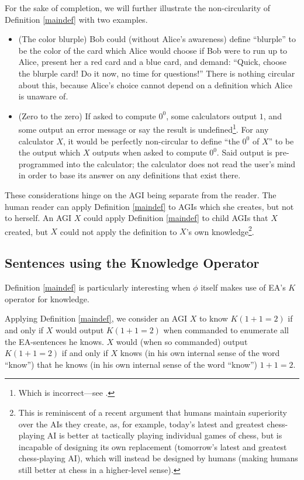 \documentclass[runningheads]{llncs}
\begin{document}
For the sake of completion, we will further illustrate the non-circularity of
Definition \ref{maindef} with two examples.
\begin{itemize}
  \item
  (The color blurple) Bob could (without Alice's awareness) define ``blurple'' to be the
  color of the card
  which Alice would choose if Bob were to run up to Alice, present her a red card
  and a blue card, and demand: ``Quick, choose the blurple card! Do it now, no time
  for questions!'' There is nothing circular about this, because Alice's choice
  cannot depend on a definition which Alice is unaware of.
  \item
  (Zero to the zero) If asked to compute $0^0$, some calculators output $1$, and some
  output an error message or say the result is undefined\footnote{Which is incorrect---see
  \cite{knuth}.}. For any calculator $X$, it
  would be perfectly non-circular to define ``the $0^0$ of $X$'' to be the output which
  $X$ outputs when asked to compute $0^0$. Said output is pre-programmed into the
  calculator; the calculator does not read the user's mind in order to base its answer
  on any definitions that exist there.
\end{itemize}

These considerations hinge on the AGI being separate from the reader.
The human reader can apply Definition \ref{maindef} to AGIs which she
creates, but not to herself. An AGI $X$ could apply Definition \ref{maindef} to child
AGIs that $X$ created, but $X$ could not apply the definition to $X$'s
own knowledge\footnote{This is reminiscent of a recent argument \cite{maguire2020people}
that humans maintain superiority over the AIs they create, as, for example,
today's latest and greatest chess-playing AI is better at tactically playing individual
games of chess, but is incapable of designing its own replacement (tomorrow's latest
and greatest chess-playing AI), which will instead be designed by humans (making humans
still better at chess in a higher-level sense).}.

\subsection{Sentences using the Knowledge Operator}

Definition \ref{maindef} is particularly interesting when $\phi$ itself
makes use of EA's $K$ operator for knowledge.

\begin{example}
Applying Definition \ref{maindef},
we consider an AGI $X$ to know $K(1+1=2)$ if and only if $X$ would output
$K(1+1=2)$ when commanded to enumerate all the EA-sentences he knows.
$X$ would (when so commanded)
output $K(1+1=2)$ if and only if $X$ knows (in his own internal sense of the word ``know'')
that he knows (in his own internal sense of the word ``know'') $1+1=2$.
\end{example}
\end{document}

